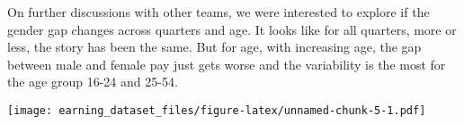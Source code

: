 \documentclass[
]{article}
\newenvironment{Shaded}{\begin{snugshade}}{\end{snugshade}}
\newcommand{\DataTypeTok}[1]{\textcolor[rgb]{0.13,0.29,0.53}{#1}}
\newcommand{\DecValTok}[1]{\textcolor[rgb]{0.00,0.00,0.81}{#1}}
\newcommand{\FloatTok}[1]{\textcolor[rgb]{0.00,0.00,0.81}{#1}}
\newcommand{\KeywordTok}[1]{\textcolor[rgb]{0.13,0.29,0.53}{\textbf{#1}}}
\newcommand{\NormalTok}[1]{#1}
\newcommand{\OperatorTok}[1]{\textcolor[rgb]{0.81,0.36,0.00}{\textbf{#1}}}
\newcommand{\OtherTok}[1]{\textcolor[rgb]{0.56,0.35,0.01}{#1}}
\newcommand{\StringTok}[1]{\textcolor[rgb]{0.31,0.60,0.02}{#1}}
\begin{document}
On further discussions with other teams, we were interested to explore
if the gender gap changes across quarters and age. It looks like for all
quarters, more or less, the story has been the same. But for age, with
increasing age, the gap between male and female pay just gets worse and
the variability is the most for the age group 16-24 and 25-54.

\begin{Shaded}
\end{Shaded}

\texttt{[image: earning\_dataset\_files/figure-latex/unnamed-chunk-5-1.pdf]}
\end{document}
